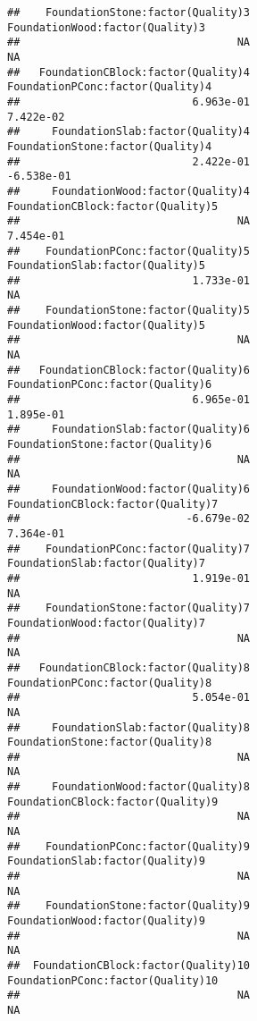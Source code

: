 \documentclass[
]{article}
\begin{document}
\begin{verbatim}
##    FoundationStone:factor(Quality)3      FoundationWood:factor(Quality)3  
##                                  NA                                   NA  
##   FoundationCBlock:factor(Quality)4     FoundationPConc:factor(Quality)4  
##                           6.963e-01                            7.422e-02  
##     FoundationSlab:factor(Quality)4     FoundationStone:factor(Quality)4  
##                           2.422e-01                           -6.538e-01  
##     FoundationWood:factor(Quality)4    FoundationCBlock:factor(Quality)5  
##                                  NA                            7.454e-01  
##    FoundationPConc:factor(Quality)5      FoundationSlab:factor(Quality)5  
##                           1.733e-01                                   NA  
##    FoundationStone:factor(Quality)5      FoundationWood:factor(Quality)5  
##                                  NA                                   NA  
##   FoundationCBlock:factor(Quality)6     FoundationPConc:factor(Quality)6  
##                           6.965e-01                            1.895e-01  
##     FoundationSlab:factor(Quality)6     FoundationStone:factor(Quality)6  
##                                  NA                                   NA  
##     FoundationWood:factor(Quality)6    FoundationCBlock:factor(Quality)7  
##                          -6.679e-02                            7.364e-01  
##    FoundationPConc:factor(Quality)7      FoundationSlab:factor(Quality)7  
##                           1.919e-01                                   NA  
##    FoundationStone:factor(Quality)7      FoundationWood:factor(Quality)7  
##                                  NA                                   NA  
##   FoundationCBlock:factor(Quality)8     FoundationPConc:factor(Quality)8  
##                           5.054e-01                                   NA  
##     FoundationSlab:factor(Quality)8     FoundationStone:factor(Quality)8  
##                                  NA                                   NA  
##     FoundationWood:factor(Quality)8    FoundationCBlock:factor(Quality)9  
##                                  NA                                   NA  
##    FoundationPConc:factor(Quality)9      FoundationSlab:factor(Quality)9  
##                                  NA                                   NA  
##    FoundationStone:factor(Quality)9      FoundationWood:factor(Quality)9  
##                                  NA                                   NA  
##  FoundationCBlock:factor(Quality)10    FoundationPConc:factor(Quality)10  
##                                  NA                                   NA  

\end{verbatim}
\end{document}
